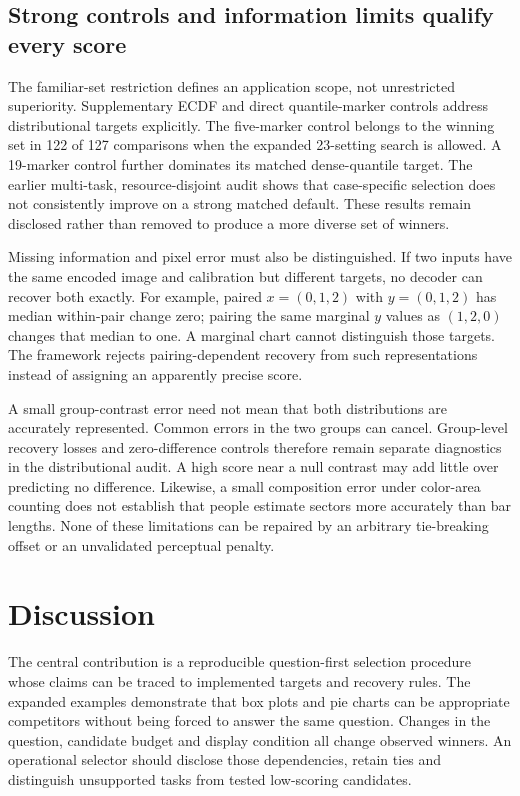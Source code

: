 \documentclass[11pt]{article}
\begin{document}
\subsection*{Strong controls and information limits qualify every score}
The familiar-set restriction defines an application scope, not unrestricted superiority. Supplementary ECDF and direct quantile-marker controls address distributional targets explicitly. The five-marker control belongs to the winning set in 122 of 127 comparisons when the expanded 23-setting search is allowed. A 19-marker control further dominates its matched dense-quantile target. The earlier multi-task, resource-disjoint audit shows that case-specific selection does not consistently improve on a strong matched default. These results remain disclosed rather than removed to produce a more diverse set of winners.

Missing information and pixel error must also be distinguished. If two inputs have the same encoded image and calibration but different targets, no decoder can recover both exactly. For example, paired $x=(0,1,2)$ with $y=(0,1,2)$ has median within-pair change zero; pairing the same marginal $y$ values as $(1,2,0)$ changes that median to one. A marginal chart cannot distinguish those targets. The framework rejects pairing-dependent recovery from such representations instead of assigning an apparently precise score.

A small group-contrast error need not mean that both distributions are accurately represented. Common errors in the two groups can cancel. Group-level recovery losses and zero-difference controls therefore remain separate diagnostics in the distributional audit. A high score near a null contrast may add little over predicting no difference. Likewise, a small composition error under color-area counting does not establish that people estimate sectors more accurately than bar lengths. None of these limitations can be repaired by an arbitrary tie-breaking offset or an unvalidated perceptual penalty.

\section*{Discussion}
The central contribution is a reproducible question-first selection procedure whose claims can be traced to implemented targets and recovery rules. The expanded examples demonstrate that box plots and pie charts can be appropriate competitors without being forced to answer the same question. Changes in the question, candidate budget and display condition all change observed winners. An operational selector should disclose those dependencies, retain ties and distinguish unsupported tasks from tested low-scoring candidates.
\end{document}
